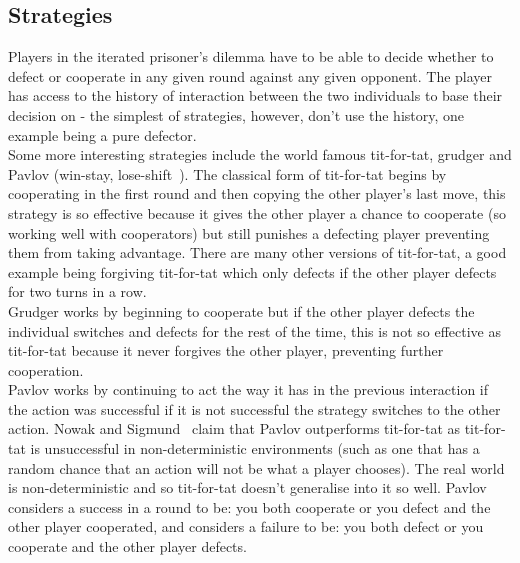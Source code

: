 \documentclass[twoside,twocolumn]{article}
\begin{document}
\subsection{Strategies}
Players in the iterated prisoner's dilemma have to be able to decide whether to defect or cooperate in any given round against any given opponent. The player has access to the history of interaction between the two individuals to base their decision on - the simplest of strategies, however, don't use the history, one example being a pure defector.\\
Some more interesting strategies include the world famous tit-for-tat, grudger and Pavlov (win-stay, lose-shift~\cite{nowak-1993a}). The classical form of tit-for-tat begins by cooperating in the first round and then copying the other player's last move, this strategy is so effective because it gives the other player a chance to cooperate (so working well with cooperators) but still punishes a defecting player preventing them from taking advantage. There are many other versions of tit-for-tat, a good example being forgiving tit-for-tat which only defects if the other player defects for two turns in a row.\\
Grudger works by beginning to cooperate but if the other player defects the individual switches and defects for the rest of the time, this is not so effective as tit-for-tat because it never forgives the other player, preventing further cooperation.\\
Pavlov works by continuing to act the way it has in the previous interaction if the action was successful if it is not successful the strategy switches to the other action. Nowak and Sigmund~\cite{nowak-1993a} claim that Pavlov outperforms tit-for-tat as tit-for-tat is unsuccessful in non-deterministic environments (such as one that has a random chance that an action will not be what a player chooses). The real world is non-deterministic and so tit-for-tat doesn't generalise into it so well. Pavlov considers a success in a round to be: you both cooperate or you defect and the other player cooperated, and considers a failure to be: you both defect or you cooperate and the other player defects.
\end{document}
